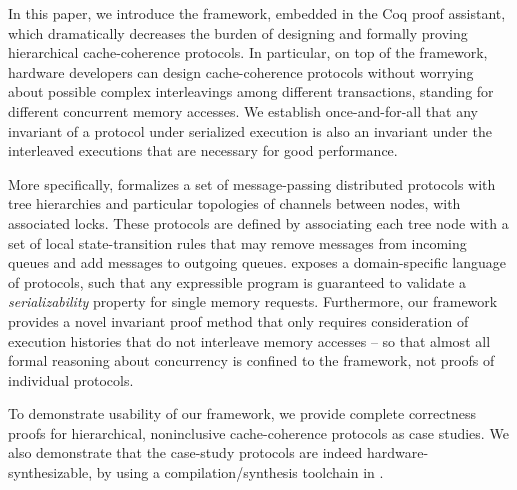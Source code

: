 \documentclass[sigplan,10pt,review,anonymous,screen]{acmart}\settopmatter{printfolios=true,printccs=false,printacmref=false}
\begin{document}
In this paper, we introduce the \hemiola{} framework, embedded in the Coq proof assistant, which dramatically decreases the burden of designing and formally proving hierarchical cache-coherence protocols.
In particular, on top of the framework, hardware developers can design cache-coherence protocols without worrying about possible complex interleavings among different transactions, standing for different concurrent memory accesses.
We establish once-and-for-all that any invariant of a protocol under serialized execution is also an invariant under the interleaved executions that are necessary for good performance.

More specifically, \hemiola{} formalizes a set of message-passing distributed protocols with tree hierarchies and particular topologies of channels between nodes, with associated locks.
These protocols are defined by associating each tree node with a set of local state-transition rules that may remove messages from incoming queues and add messages to outgoing queues.
\hemiola{} exposes a domain-specific language of protocols, such that any expressible program is guaranteed to validate a \emph{serializability} property for single memory requests.
Furthermore, our framework provides a novel invariant proof method that only requires consideration of execution histories that do not interleave memory accesses -- so that almost all formal reasoning about concurrency is confined to the framework, not proofs of individual protocols.

To demonstrate usability of our framework, we provide complete correctness proofs for hierarchical, noninclusive cache-coherence protocols as case studies.
We also demonstrate that the case-study protocols are indeed hardware-synthesizable, by using a compilation/synthesis toolchain in \hemiola{}.
\end{document}
